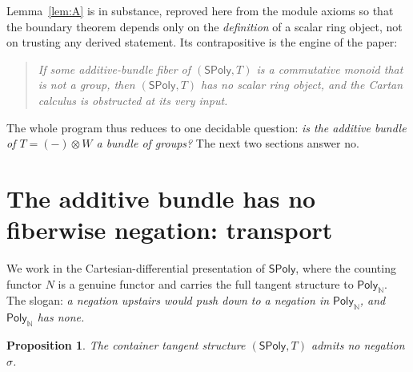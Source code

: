 \documentclass[11pt]{article}
\newtheorem{proposition}[theorem]{Proposition}
\theoremstyle{definition}
\newcommand{\SPoly}{\mathsf{SPoly}}
\newcommand{\PolyN}{\mathsf{Poly}_{\mathbb{N}}}
\begin{document}
Lemma~\ref{lem:A} is \cite[Prop.~4.4]{AintablianBlohmann2026} in substance, reproved here
from the module axioms so that the boundary theorem depends only on the
\emph{definition} of a scalar ring object, not on trusting any derived statement. Its
contrapositive is the engine of the paper:

\begin{quote}
\emph{If some additive-bundle fiber of $(\SPoly,T)$ is a commutative monoid that is not a
group, then $(\SPoly,T)$ has no scalar ring object, and the Cartan calculus is obstructed
at its very input.}
\end{quote}

The whole program thus reduces to one decidable question: \emph{is the additive bundle of
$T=(-)\otimes W$ a bundle of groups?} The next two sections answer no.

\section{The additive bundle has no fiberwise negation: transport}\label{sec:transport}

We work in the Cartesian-differential presentation of $\SPoly$, where the counting functor
$N$ is a genuine functor and carries the full tangent structure to $\PolyN$. The slogan:
\emph{a negation upstairs would push down to a negation in $\PolyN$, and $\PolyN$ has
none.}

\begin{proposition}\label{prop:transport}
The container tangent structure $(\SPoly,T)$ admits no negation $\sigma$.
\end{proposition}
\end{document}
